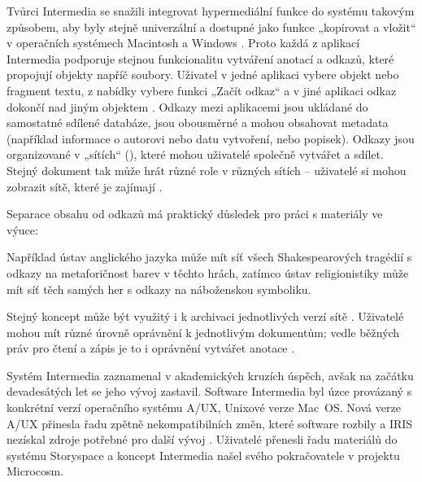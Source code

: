 Tvůrci Intermedia se snažili integrovat hypermediální funkce do systému takovým způsobem, aby byly stejně univerzální a dostupné jako funkce „kopírovat a vložit“ v operačních systémech Macintosh a Windows \autocite[38]{Haan1992}. Proto každá z aplikací Intermedia podporuje stejnou funkcionalitu vytváření anotací a odkazů, které propojují objekty napříč soubory. Uživatel v jedné aplikaci vybere objekt nebo fragment textu, z nabídky vybere funkci „Začít odkaz“ a v jiné aplikaci odkaz dokončí nad jiným objektem \autocite[82]{Yankelovich1988}. Odkazy mezi aplikacemi jsou ukládané do samostatné sdílené databáze, jsou obousměrné a mohou obsahovat metadata (například informace o autorovi nebo datu vytvoření, nebo popisek). Odkazy jsou organizované v „sítích“ (), které mohou uživatelé společně vytvářet a sdílet. Stejný dokument tak může hrát různé role v různých sítích -- uživatelé si mohou zobrazit sítě, které je zajímají \autocite[30]{Muller-Prove2002}.

Separace obsahu od odkazů má praktický důsledek pro práci s materiály ve výuce:

\begin{quoted}{\autocites[27]{Yankelovich1985}[112]{Barnet2014}}
Například ústav anglického jazyka může mít síť všech Shakespearových tragédií s odkazy na metaforičnost barev v těchto hrách, zatímco ústav religionistiky může mít síť těch samých her s odkazy na náboženskou symboliku.
\end{quoted}

Stejný koncept může být využitý i k archivaci jednotlivých verzí sítě \autocite[30]{Muller-Prove2002}. Uživatelé mohou mít různé úrovně oprávnění k jednotlivým dokumentům; vedle běžných práv pro čtení a zápis je to i oprávnění vytvářet anotace \autocite[90]{Yankelovich1988}.

Systém Intermedia zaznamenal v akademických kruzích úspěch, avšak na začátku devadesátých let se jeho vývoj zastavil. Software Intermedia byl úzce provázaný s konkrétní verzí operačního systému A/UX, Unixové verze Mac~OS. Nová verze A/UX přinesla řadu zpětně nekompatibilních změn, které software rozbily a IRIS nezískal zdroje potřebné pro další vývoj \autocites[51]{Nielsen1995}[112--113]{Barnet2014}[221]{Wright2007}. Uživatelé přenesli řadu materiálů do systému Storyspace a koncept Intermedia našel svého pokračovatele v projektu Microcosm.

